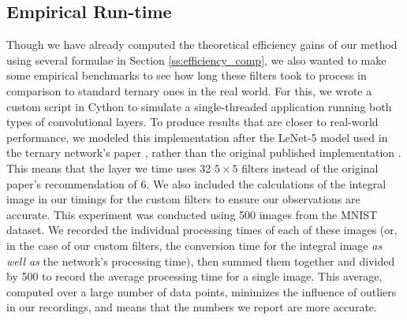 \documentclass[11pt,a4paper,oldfontcommands]{memoir}
\begin{document}
\subsection{Empirical Run-time}
Though we have already computed the theoretical efficiency gains of our method using several formulae in Section \ref{ss:efficiency_comp}, we also wanted to make some empirical benchmarks to see how long these filters took to process in comparison to standard ternary ones in the real world. For this, we wrote a custom script in Cython to simulate a single-threaded application running both types of convolutional layers. To produce results that are closer to real-world performance, we modeled this implementation after the LeNet-5 model used in the ternary network's paper \cite{ternary}, rather than the original published implementation \cite{lenet5}. This means that the layer we time uses 32 $5 \times 5$ filters instead of the original paper's recommendation of 6. We also included the calculations of the integral image in our timings for the custom filters to ensure our observations are accurate. This experiment was conducted using 500 images from the MNIST dataset. We recorded the individual processing times of each of these images (or, in the case of our custom filters, the conversion time for the integral image \textit{as well as} the network's processing time), then summed them together and divided by 500 to record the average processing time for a single image. This average, computed over a large number of data points, minimizes the influence of outliers in our recordings, and means that the numbers we report are more accurate.
\end{document}

